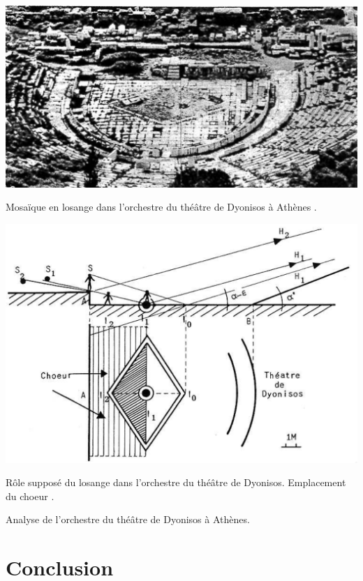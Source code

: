 \begin{figureth}
	\begin{subfigureth}{0.48\textwidth}
		\includegraphics[width=\linewidth]{images/dyonisos1}
		\caption[Mosaïque en losange dans l'orchestre du théâtre de Dyonisos à Athènes.]{Mosaïque en losange dans l'orchestre du théâtre de Dyonisos à Athènes \footnotemark.}
		\label{dyonisos1}
		\hfill
		\quad
	\end{subfigureth}
	\quad
	\begin{subfigureth}{0.48\textwidth}
		\includegraphics[width=\linewidth]{images/dyonisos2}
		\caption[Rôle supposé du losange dans l'orchestre du théâtre de Dyonisos. Emplacement du choeur.]{Rôle supposé du losange dans l'orchestre du théâtre de Dyonisos. Emplacement du choeur \footnotemark.}
		\label{dyonisos2}
		\quad
	\end{subfigureth} 
\caption{Analyse de l'orchestre du théâtre de Dyonisos à Athènes.}	
\label{dyonisos}
\end{figureth}	
\addtocounter{footnote}{-1}
\addtocounter{footnote}{1}

\chapter*{Conclusion}

\newpage

 
 

